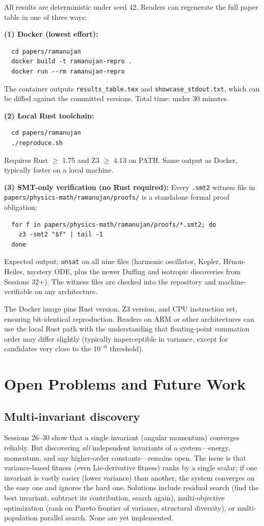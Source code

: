 All results are deterministic under seed 42. Readers can regenerate the full paper table in one of three ways:

\textbf{(1) Docker (lowest effort):}
\begin{verbatim}
  cd papers/ramanujan
  docker build -t ramanujan-repro .
  docker run --rm ramanujan-repro
\end{verbatim}
The container outputs \texttt{results\_table.tex} and \texttt{showcase\_stdout.txt}, which can be diffed against the committed versions. Total time: under 30 minutes.

\textbf{(2) Local Rust toolchain:}
\begin{verbatim}
  cd papers/ramanujan
  ./reproduce.sh
\end{verbatim}
Requires Rust $\geq$ 1.75 and Z3 $\geq$ 4.13 on PATH. Same output as Docker, typically faster on a local machine.

\textbf{(3) SMT-only verification (no Rust required):}
Every \texttt{.smt2} witness file in \texttt{papers/physics-math/ramanujan/proofs/} is a standalone formal proof obligation:
\begin{verbatim}
  for f in papers/physics-math/ramanujan/proofs/*.smt2; do
    z3 -smt2 "$f" | tail -1
  done
\end{verbatim}
Expected output: \texttt{unsat} on all nine files (harmonic oscillator, Kepler, Hénon-Heiles, mystery ODE, plus the newer Duffing and isotropic discoveries from Sessions 32+). The witness files are checked into the repository and machine-verifiable on any architecture.

The Docker image pins Rust version, Z3 version, and CPU instruction set, ensuring bit-identical reproduction. Readers on ARM or other architectures can use the local Rust path with the understanding that floating-point summation order may differ slightly (typically imperceptible in variance, except for candidates very close to the $10^{-6}$ threshold).

\section{Open Problems and Future Work}

\subsection{Multi-invariant discovery}

Sessions 26--30 show that a single invariant (angular momentum) converges reliably. But discovering \textit{all} independent invariants of a system---energy, momentum, and any higher-order constants---remains open. The issue is that variance-based fitness (even Lie-derivative fitness) ranks by a single scalar; if one invariant is vastly easier (lower variance) than another, the system converges on the easy one and ignores the hard one. Solutions include residual search (find the best invariant, subtract its contribution, search again), multi-objective optimization (rank on Pareto frontier of {variance, structural diversity}), or multi-population parallel search. None are yet implemented.

